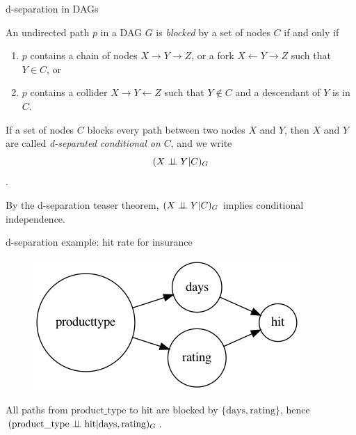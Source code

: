 \begin{frame}{d-separation in DAGs}
  \begin{definition}
    An undirected path $p$ in a DAG $G$ is \emph{blocked} by a set of nodes $C$ if and only if
    \begin{enumerate}
      \item $p$ contains a chain of nodes $X \to Y \to Z$, or a fork $X \leftarrow Y \rightarrow Z$ such that $Y \in C$, or
      \item $p$ contains a collider $X \to Y \leftarrow Z$ such that $Y \notin C$ and a descendant of $Y$ is in $C$.
    \end{enumerate}
  \end{definition}

  \begin{definition}
    If a set of nodes $C$ blocks every path between two nodes $X$ and $Y$, then $X$ and $Y$ are called \emph{d-separated conditional on $C$}, and we write
    $$(X \perp\!\!\!\perp Y | C)_{G}$$.
  \end{definition}

  By the d-separation teaser theorem, $(X \perp\!\!\!\perp Y | C)_{G}$ implies conditional independence.\newline
\end{frame}


\begin{frame}{d-separation example: hit rate for insurance}
  \begin{figure}[ht]
    \centering
    \includegraphics[height=0.5\textheight]{graphics/hits}
  \end{figure}

  All paths from $\mathrm{product\_type}$ to $\mathrm{hit}$ are blocked by $\{\mathrm{days}, \mathrm{rating}\}$, hence $(\mathrm{product\_type} \perp\!\!\!\perp \mathrm{hit} | \mathrm{days}, \mathrm{rating})_G$.
\end{frame}


